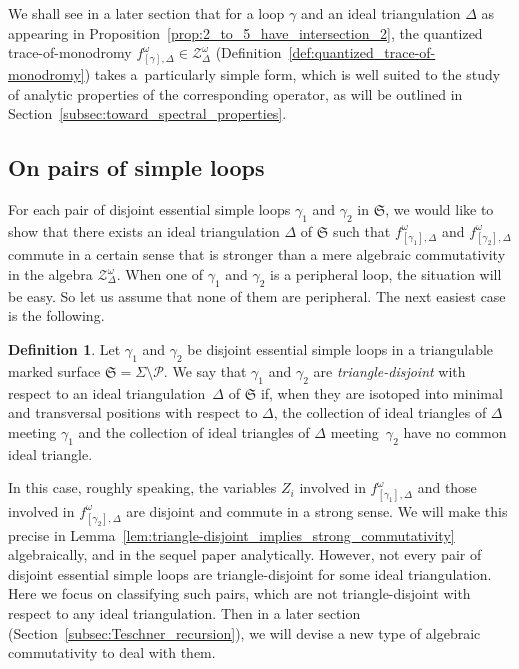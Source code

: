 \documentclass[pdftex]{sigma}
\numberwithin{equation}{section}
\theoremstyle{definition}
\newtheorem{Definition}[Theorem]{Definition}
\begin{document}
We shall see in a later section that for a loop $\gamma$ and an ideal triangulation $\Delta$ as appearing in Proposition~\ref{prop:2_to_5_have_intersection_2}, the quantized trace-of-monodromy $f^\omega_{[\gamma],\Delta}\in \mathcal{Z}^\omega_\Delta$ (Definition~\ref{def:quantized_trace-of-monodromy}) takes a~particularly simple form, which is well suited to the study of analytic properties of the corresponding operator, as will be outlined in Section~\ref{subsec:toward_spectral_properties}.
\subsection{On pairs of simple loops}
\label{subsec:pais_of_simple_loops}
For each pair of disjoint essential simple loops $\gamma_1$ and $\gamma_2$ in $\mathfrak{S}$, we would like to show that there exists an ideal triangulation $\Delta$ of $\mathfrak{S}$ such that $f^\omega_{[\gamma_1],\Delta}$ and $f^\omega_{[\gamma_2],\Delta}$ commute in a certain sense that is stronger than a mere algebraic commutativity in the algebra $\mathcal{Z}^\omega_\Delta$.
When one of $\gamma_1$ and $\gamma_2$ is a peripheral loop, the situation will be easy. So let us assume that none of them are peripheral. The next easiest case is the following.
\begin{Definition}
\label{def:triangle-disjoint}
Let $\gamma_1$ and $\gamma_2$ be disjoint essential simple loops in a triangulable marked surface $\mathfrak{S} = \Sigma \setminus \mathcal{P}$. We say that $\gamma_1$ and $\gamma_2$ are {\em triangle-disjoint} with respect to an ideal triangulation~$\Delta$ of $\mathfrak{S}$ if, when they are isotoped into minimal and transversal positions with respect to $\Delta$, the collection of ideal triangles of $\Delta$ meeting $\gamma_1$ and the collection of ideal triangles of $\Delta$ meeting~$\gamma_2$ have no common ideal triangle.
\end{Definition}
In this case, roughly speaking, the variables $Z_i$ involved in $f^\omega_{[\gamma_1],\Delta}$ and those involved in $f^\omega_{[\gamma_2],\Delta}$ are disjoint and commute in a strong sense. We will make this precise in Lemma~\ref{lem:triangle-disjoint_implies_strong_commutativity} algebraically, and in the sequel paper \cite{sequel} analytically.
However, not every pair of disjoint essential simple loops are triangle-disjoint for some ideal triangulation. Here we focus on classifying such pairs, which are not triangle-disjoint with respect to any ideal triangulation. Then in a later section (Section~\ref{subsec:Teschner_recursion}), we will devise a new type of algebraic commutativity to deal with them.
\end{document}
